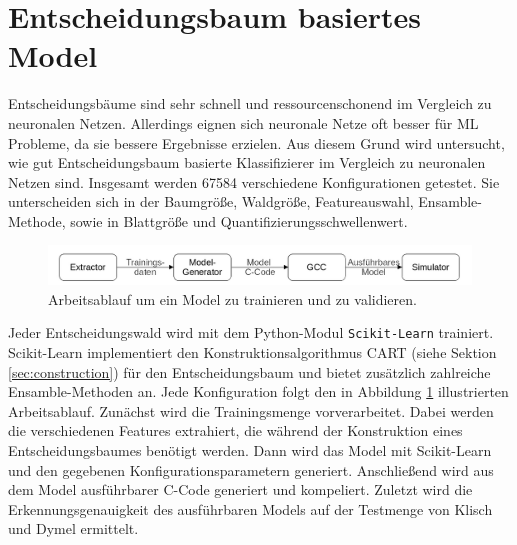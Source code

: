 \section{Entscheidungsbaum basiertes Model}
Entscheidungsbäume sind sehr schnell und ressourcenschonend im Vergleich zu neuronalen Netzen. Allerdings eignen sich neuronale Netze oft besser für ML Probleme, da sie bessere Ergebnisse
erzielen. Aus diesem Grund wird untersucht, wie gut Entscheidungsbaum basierte Klassifizierer im Vergleich zu neuronalen Netzen sind. Insgesamt werden 67584 verschiedene Konfigurationen getestet.
Sie unterscheiden sich in der Baumgröße, Waldgröße, Featureauswahl, Ensamble-Methode, sowie in Blattgröße und Quantifizierungsschwellenwert.
\newline
\begin{figure}
    \centering
    \includegraphics[width=\linewidth]{images/model_workflow.jpg}
    \caption{Arbeitsablauf um ein Model zu trainieren und zu validieren.}
    \label{fig:model_workflow}
\end{figure}
\newline
Jeder Entscheidungswald wird mit dem Python-Modul \texttt{Scikit-Learn} trainiert. Scikit-Learn implementiert den Konstruktionsalgorithmus CART (siehe Sektion \ref{sec:construction}) für den Entscheidungsbaum und bietet
zusätzlich zahlreiche Ensamble-Methoden an. Jede Konfiguration folgt den in Abbildung \ref{fig:model_workflow} illustrierten Arbeitsablauf.
\newline
\newline
Zunächst wird die Trainingsmenge vorverarbeitet. Dabei werden die verschiedenen
Features extrahiert, die während der Konstruktion eines Entscheidungsbaumes benötigt werden. Dann wird das Model mit Scikit-Learn und den gegebenen Konfigurationsparametern generiert. Anschließend wird aus dem Model
ausführbarer C-Code generiert und kompeliert. Zuletzt wird die Erkennungsgenauigkeit des ausführbaren Models auf der Testmenge von Klisch und Dymel ermittelt.

